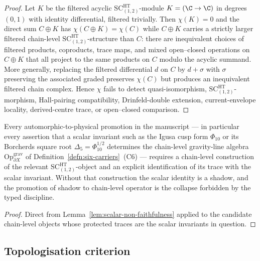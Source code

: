 \begin{proof}
Let \(K\) be the filtered acyclic
\(\mathrm{SC}^{\mathrm{HT}}_{(1,2)}\)-module
\(K=(\C\to\C)\) in degrees \((0,1)\) with identity differential,
filtered trivially.  Then \(\chi(K)=0\) and the direct sum
\(C\oplus K\) has \(\chi(C\oplus K)=\chi(C)\) while
\(C\oplus K\) carries a strictly larger filtered chain-level
\(\mathrm{SC}^{\mathrm{HT}}_{(1,2)}\)-structure than \(C\): there are
inequivalent choices of filtered products, coproducts, trace maps,
and mixed open--closed operations on \(C\oplus K\) that all project
to the same products on \(C\) modulo the acyclic summand.  More
generally, replacing the filtered differential \(d\) on \(C\) by
\(d+\sigma\) with \(\sigma\) preserving the associated graded
preserves \(\chi(C)\) but produces an inequivalent filtered chain
complex.  Hence \(\chi\) fails to detect quasi-isomorphism,
\(\mathrm{SC}^{\mathrm{HT}}_{(1,2)}\)-morphism, Hall-pairing
compatibility, Drinfeld-double extension, current-envelope locality,
derived-centre trace, or open--closed comparison.
\end{proof}

\begin{cor}
\label{cor:mandatory-chain-supplements}
Every automorphic-to-physical promotion in the manuscript --- in
particular every assertion that a scalar invariant such as the Igusa
cusp form \(\Phi_{10}\) or its Borcherds square root
\(\Delta_5=\Phi_{10}^{1/2}\) determines the chain-level gravity-line
algebra \(\mathrm{Op}^{\mathrm{grav}}_{\partial X}\) of
Definition~\ref{defn:six-carriers}~(C6) --- requires a chain-level
construction of the relevant
\(\mathrm{SC}^{\mathrm{HT}}_{(1,2)}\)-object and an explicit
identification of its trace with the scalar invariant.  Without that
construction the scalar identity is a shadow, and the promotion of
shadow to chain-level operator is the collapse forbidden by the
typed discipline.
\end{cor}

\begin{proof}
Direct from Lemma~\ref{lem:scalar-non-faithfulness} applied to the
candidate chain-level objects whose protected traces are the
scalar invariants in question.
\end{proof}

\subsection{Topologisation criterion}
\label{ssec:topologisation}

